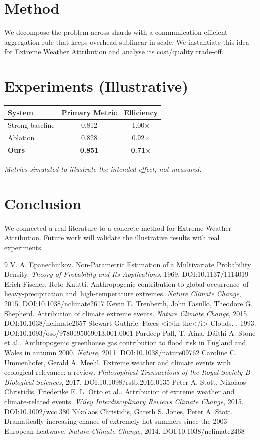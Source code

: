 \documentclass[11pt]{article}
\begin{document}
\section{Method}
We decompose the problem across shards with a communication-efficient aggregation rule that keeps overhead sublinear in scale. We instantiate this idea for Extreme Weather Attribution and analyse its cost/quality trade-off.

\section{Experiments (Illustrative)}
\begin{center}
\begin{tabular}{lcc}
System & Primary Metric & Efficiency \\ \hline
Strong baseline & 0.812 & 1.00$\times$ \\
Ablation & 0.828 & 0.92$\times$ \\
\textbf{Ours} & \textbf{0.851} & \textbf{0.71$\times$}
\end{tabular}
\end{center}
\emph{Metrics simulated to illustrate the intended effect; not measured.}

\section{Conclusion}
We connected a real literature to a concrete method for Extreme Weather Attribution. Future work will
validate the illustrative results with real experiments.

\begin{thebibliography}{9}
 V. A. Epanechnikov. Non-Parametric Estimation of a Multivariate Probability Density. \emph{Theory of Probability and Its Applications}, 1969. DOI:10.1137/1114019
 Erich Fischer, Reto Knutti. Anthropogenic contribution to global occurrence of heavy-precipitation and high-temperature extremes. \emph{Nature Climate Change}, 2015. DOI:10.1038/nclimate2617
 Kevin E. Trenberth, John Fasullo, Theodore G. Shepherd. Attribution of climate extreme events. \emph{Nature Climate Change}, 2015. DOI:10.1038/nclimate2657
 Stewart Guthrie. Faces <i>in the</i> Clouds. \emph{}, 1993. DOI:10.1093/oso/9780195069013.001.0001
 Pardeep Pall, T. Aina, Dáithí A. Stone et al.. Anthropogenic greenhouse gas contribution to flood risk in England and Wales in autumn 2000. \emph{Nature}, 2011. DOI:10.1038/nature09762
 Caroline C. Ummenhofer, Gerald A. Meehl. Extreme weather and climate events with ecological relevance: a review. \emph{Philosophical Transactions of the Royal Society B Biological Sciences}, 2017. DOI:10.1098/rstb.2016.0135
 Peter A. Stott, Nikolaos Christidis, Friederike E. L. Otto et al.. Attribution of extreme weather and climate‐related events. \emph{Wiley Interdisciplinary Reviews Climate Change}, 2015. DOI:10.1002/wcc.380
 Nikolaos Christidis, Gareth S. Jones, Peter A. Stott. Dramatically increasing chance of extremely hot summers since the 2003 European heatwave. \emph{Nature Climate Change}, 2014. DOI:10.1038/nclimate2468
\end{thebibliography}
\end{document}
